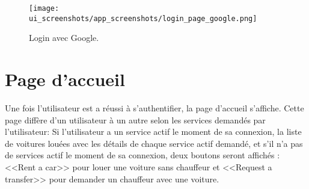\begin{center}
    \begin{figure}[H]
        \centering
        \texttt{[image: ui\_screenshots/app\_screenshots/login\_page\_google.png]}
        \vspace{1cm}
        \captionsetup{justification=centering}

        \caption{Login avec Google.}
        \label{fig:app_login_google}
    \end{figure}
\end{center}
\vspace{1cm}

\section{Page d'accueil}
Une fois l'utilisateur est a réussi à s'authentifier, la page d'accueil s'affiche. Cette page diffère d'un utilisateur à un autre selon les services demandés par l'utilisateur: Si l'utilisateur a un service actif le moment de sa connexion, la liste de voitures louées avec les détails de chaque service actif demandé, et s'il n'a pas de services actif le moment de sa connexion, deux boutons seront affichés : <<Rent a car>> pour louer une voiture sans chauffeur et <<Request a transfer>> pour demander un chauffeur avec une voiture.
\vspace{1cm}

\vspace{1cm}

